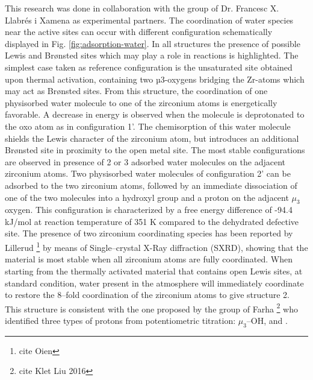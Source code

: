 This research was done in collaboration with the group of Dr. Francesc X. Llabr\'es i Xamena as experimental partners. The coordination of water species near the active sites can occur with different configuration schematically displayed in Fig. \ref{fig:adsorption-water}. 
In all structures the presence of possible Lewis and Brønsted sites which may play a role in reactions is highlighted. The simplest case taken as reference configuration is the unsaturated site obtained upon thermal activation, containing two µ3-oxygens bridging the Zr-atoms which may act as Br\o{}nsted sites. From this structure, the coordination of one physisorbed water molecule to one of the zirconium atoms is energetically favorable. A decrease in energy is observed when the molecule is deprotonated to the oxo atom as in configuration 1’. The chemisorption of this water molecule shields the Lewis character of the zirconium atom, but introduces an additional Br\o{}nsted site in proximity to the open metal site. The most stable configurations are observed in presence of 2 or 3 adsorbed water molecules on the adjacent zirconium atoms. Two physisorbed water molecules of configuration 2’ can be adsorbed to the two zirconium atoms, followed by an immediate dissociation of one of the two molecules into a hydroxyl group and a proton on the adjacent $\mu_3$ oxygen. This configuration is characterized by a free energy difference of -94.4 kJ/mol at reaction temperature of 351 K compared to the dehydrated defective site. The presence of two zirconium coordinating species has been reported by Lillerud \footnote{cite Oien} by means of Single--crystal X-Ray diffraction (SXRD), showing that the material is most stable when all zirconium atoms are fully coordinated. When starting from the thermally activated material that contains open Lewis sites, at standard condition, water present in the atmosphere will immediately coordinate to restore the 8--fold coordination of the zirconium atoms to give structure 2. This structure is consistent with the one proposed by the group of Farha \footnote{cite Klet Liu 2016} who identified three types of protons from potentiometric titration:  $\mu_3$--OH,  and . 
